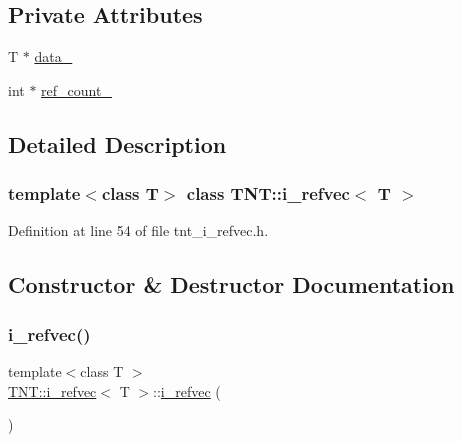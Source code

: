 \subsection*{Private Attributes}
\begin{DoxyCompactItemize}
\item 
T $\ast$ \hyperlink{classTNT_1_1i__refvec_a1a6a387d48253f7781ce3b9c13adc9d0}{data\+\_\+}
\item 
int $\ast$ \hyperlink{classTNT_1_1i__refvec_a639b7558a1a52403161d66730558015a}{ref\+\_\+count\+\_\+}
\end{DoxyCompactItemize}


\subsection{Detailed Description}
\subsubsection*{template$<$class T$>$\newline
class T\+N\+T\+::i\+\_\+refvec$<$ T $>$}



Definition at line 54 of file tnt\+\_\+i\+\_\+refvec.\+h.



\subsection{Constructor \& Destructor Documentation}
\mbox{\label{classTNT_1_1i__refvec_a83b19a5a8ae088c4996579f1f5e03578}} 
\subsubsection{\texorpdfstring{i\+\_\+refvec()}{i\_refvec()}\hspace{0.1cm}{\footnotesize\ttfamily [1/4]}}
{\footnotesize\ttfamily template$<$class T $>$ \\
\hyperlink{classTNT_1_1i__refvec}{T\+N\+T\+::i\+\_\+refvec}$<$ T $>$\+::\hyperlink{classTNT_1_1i__refvec}{i\+\_\+refvec} (\begin{DoxyParamCaption}{ }\end{DoxyParamCaption})}



